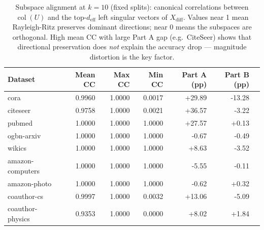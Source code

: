 \begin{table}[t]
\centering\small\setlength{\tabcolsep}{5pt}
\caption{Subspace alignment at $k=10$ (fixed splits): canonical correlations between $\operatorname{col}(U)$ and the top-$d_{\mathrm{eff}}$ left singular vectors of $X_{\mathrm{diff}}$. Values near 1 mean Rayleigh-Ritz preserves dominant directions; near 0 means the subspaces are orthogonal. High mean CC with large Part A gap (e.g.\ CiteSeer) shows that directional preservation does \emph{not} explain the accuracy drop --- magnitude distortion is the key factor.}
\label{tab:subspace_alignment}
\begin{tabular}{lrrrrrr}
\toprule
Dataset & Mean CC & Max CC & Min CC & Part A (pp) & Part B (pp) \\
\midrule
cora & 0.9960 & 1.0000 & 0.0017 & +29.89 & -13.28 \\
citeseer & 0.9758 & 1.0000 & 0.0021 & +36.57 & -3.22 \\
pubmed & 1.0000 & 1.0000 & 1.0000 & +27.57 & +0.13 \\
ogbn\mbox{-}arxiv & 1.0000 & 1.0000 & 1.0000 & -0.67 & -0.49 \\
wikics & 1.0000 & 1.0000 & 1.0000 & +8.63 & -3.52 \\
amazon\mbox{-}computers & 1.0000 & 1.0000 & 1.0000 & -5.55 & -0.11 \\
amazon\mbox{-}photo & 1.0000 & 1.0000 & 1.0000 & -0.62 & +0.32 \\
coauthor\mbox{-}cs & 0.9997 & 1.0000 & 0.0032 & +13.06 & -5.09 \\
coauthor\mbox{-}physics & 0.9353 & 1.0000 & 0.0000 & +8.02 & +1.84 \\
\bottomrule\end{tabular}\end{table}